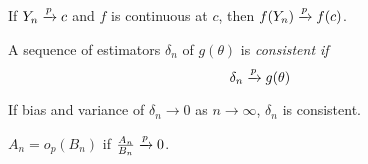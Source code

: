\begin{thm}
    If $Y_n \xrightarrow{p} c$ and $f$ is continuous at $c$, then $f(Y_n) \xrightarrow{p} f(c)$.
\end{thm}

\begin{definition}
    A sequence of estimators $\delta_n$ of $g(\theta)$ is \it{consistent} if
    \begin{equation*}
        \delta_n \xrightarrow{p} g(\theta)
    \end{equation*}
\end{definition}

\begin{thm}
    If bias and variance of $\delta_n \to 0$ as $n \to \infty$, $\delta_n$ 
    is consistent.
\end{thm}

\begin{definition}
    $A_n = o_p (B_n)$ if $ \frac{A_n}{B_n} \xrightarrow{p} 0$.
\end{definition}
